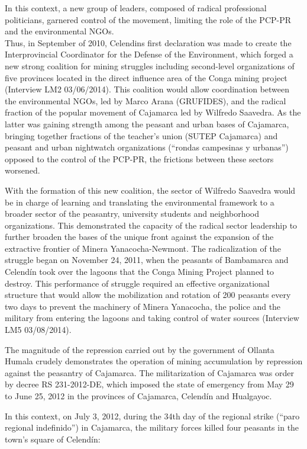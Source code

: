 \documentclass[
]{article}
\begin{document}
In this context, a new group of leaders, composed of radical
professional politicians, garnered control of the movement, limiting the
role of the PCP-PR and the environmental NGOs.\\
Thus, in September of 2010, Celendin\textquotesingle s first declaration
was made to create the Interprovincial Coordinator for the Defense of
the Environment, which forged a new strong coalition for mining
struggles including second-level organizations of five provinces located
in the direct influence area of the Conga mining project (Interview LM2
03/06/2014). This coalition would allow coordination between the
environmental NGOs, led by Marco Arana (GRUFIDES), and the radical
fraction of the popular movement of Cajamarca led by Wilfredo Saavedra.
As the latter was gaining strength among the peasant and urban bases of
Cajamarca, bringing together fractions of the teacher's union (SUTEP
Cajamarca) and peasant and urban nightwatch organizations (``rondas
campesinas y urbanas'') opposed to the control of the PCP-PR, the
frictions between these sectors worsened.

With the formation of this new coalition, the sector of Wilfredo
Saavedra would be in charge of learning and translating the
environmental framework to a broader sector of the peasantry, university
students and neighborhood organizations. This demonstrated the capacity
of the radical sector leadership to further broaden the bases of the
unique front against the expansion of the extractive frontier of Minera
Yanacocha-Newmont. The radicalization of the struggle began on November
24, 2011, when the peasants of Bambamarca and Celendín took over the
lagoons that the Conga Mining Project planned to destroy. This
performance of struggle required an effective organizational structure
that would allow the mobilization and rotation of 200 peasants every two
days to prevent the machinery of Minera Yanacocha, the police and the
military from entering the lagoons and taking control of water sources
(Interview LM5 03/08/2014).

The magnitude of the repression carried out by the government of Ollanta
Humala crudely demonstrates the operation of mining accumulation by
repression against the peasantry of Cajamarca. The militarization of
Cajamarca was order by decree RS 231-2012-DE, which imposed the state of
emergency from May 29 to June 25, 2012 in the provinces of Cajamarca,
Celendín and Hualgayoc.

In this context, on July 3, 2012, during the 34th day of the regional
strike (``paro regional indefinido'') in Cajamarca, the military forces
killed four peasants in the town's square of Celendín:
\end{document}
